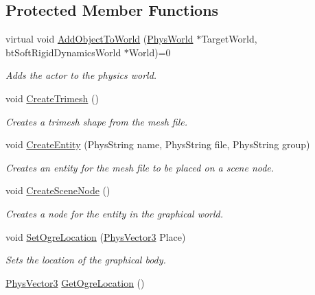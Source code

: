 \subsection*{Protected Member Functions}
\begin{DoxyCompactItemize}
\item 
virtual void \hyperlink{classActorBase_a1af82a2ed960fd114518fdf84d5ff146}{AddObjectToWorld} (\hyperlink{classPhysWorld}{PhysWorld} $\ast$TargetWorld, btSoftRigidDynamicsWorld $\ast$World)=0
\begin{DoxyCompactList}\small\item\em Adds the actor to the physics world. \item\end{DoxyCompactList}\item 
void \hyperlink{classActorBase_af7f0806222c79b5d5120dccefd93715e}{CreateTrimesh} ()
\begin{DoxyCompactList}\small\item\em Creates a trimesh shape from the mesh file. \item\end{DoxyCompactList}\item 
void \hyperlink{classActorBase_aa87583c47b8653e8ac7d96f1481b57fd}{CreateEntity} (PhysString name, PhysString file, PhysString group)
\begin{DoxyCompactList}\small\item\em Creates an entity for the mesh file to be placed on a scene node. \item\end{DoxyCompactList}\item 
void \hyperlink{classActorBase_a168cd57e20b2adfc5cae21627ddbae31}{CreateSceneNode} ()
\begin{DoxyCompactList}\small\item\em Creates a node for the entity in the graphical world. \item\end{DoxyCompactList}\item 
void \hyperlink{classActorBase_a3140cc5c1c630efc1c04c20ada319b8b}{SetOgreLocation} (\hyperlink{classPhysVector3}{PhysVector3} Place)
\begin{DoxyCompactList}\small\item\em Sets the location of the graphical body. \item\end{DoxyCompactList}\item 
\hyperlink{classPhysVector3}{PhysVector3} \hyperlink{classActorBase_a73ee03084b2ca78659b6e6439cafa75f}{GetOgreLocation} ()

\end{DoxyCompactItemize}
